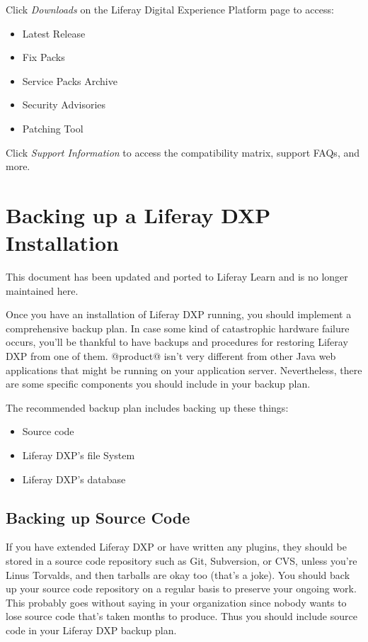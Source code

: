 Click \emph{Downloads} on the Liferay Digital Experience Platform page
to access:

\begin{itemize}
\tightlist
\item
  Latest Release
\item
  Fix Packs
\item
  Service Packs Archive
\item
  Security Advisories
\item
  Patching Tool
\end{itemize}

Click \emph{Support Information} to access the compatibility matrix,
support FAQs, and more.

\chapter{Backing up a Liferay DXP
Installation}\label{backing-up-a-liferay-dxp-installation}

{This document has been updated and ported to Liferay Learn and is no
longer maintained here.}

Once you have an installation of Liferay DXP running, you should
implement a comprehensive backup plan. In case some kind of catastrophic
hardware failure occurs, you'll be thankful to have backups and
procedures for restoring Liferay DXP from one of them. @product@ isn't
very different from other Java web applications that might be running on
your application server. Nevertheless, there are some specific
components you should include in your backup plan.

The recommended backup plan includes backing up these things:

\begin{itemize}
\tightlist
\item
  Source code
\item
  Liferay DXP's file System
\item
  Liferay DXP's database
\end{itemize}

\section{Backing up Source Code}\label{backing-up-source-code}

If you have extended Liferay DXP or have written any plugins, they
should be stored in a source code repository such as Git, Subversion, or
CVS, unless you're Linus Torvalds, and then tarballs are okay too
(that's a joke). You should back up your source code repository on a
regular basis to preserve your ongoing work. This probably goes without
saying in your organization since nobody wants to lose source code
that's taken months to produce. Thus you should include source code in
your Liferay DXP backup plan.

